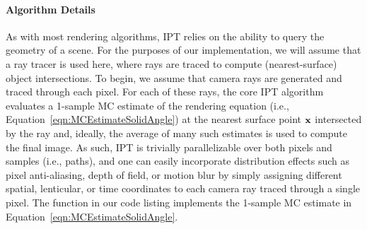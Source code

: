 \vspace{-10pt} %


\paragraph{Algorithm Details}
\label{sec:IPTalgorithm}
As with most rendering algorithms, IPT relies on the ability to query the geometry of a scene. For the purposes of our implementation, we will assume that a ray tracer is used here, where rays are traced to compute (nearest-surface) object intersections.
%
%
To begin, we assume that camera rays are generated and traced through each pixel. For each of these rays, the core IPT algorithm evaluates a 1-sample MC estimate of the rendering equation (i.e., Equation~\ref{eqn:MCEstimateSolidAngle}) at the nearest surface point $\mathbf{x}$ intersected by the ray and, ideally, the average of many such estimates is used to compute the final image. As such, IPT is trivially parallelizable over both pixels and samples (i.e., paths), and one can easily incorporate distribution effects such as pixel anti-aliasing, depth of field, or motion blur by simply assigning different spatial, lenticular, or time coordinates to each camera ray traced through a single pixel. The \code{\textcolor{myred}{Lo}} function in our code listing implements the 1-sample MC estimate in Equation~\ref{eqn:MCEstimateSolidAngle}.

